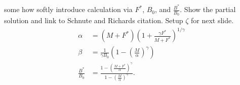 \documentclass[ xcolor = pdftex, dvipsnames, table ]{beamer}
\begin{document}
\begin{frame}
\begin{minipage}[h!]{0.52\textwidth}
\end{minipage}

\end{frame}

%
%

%
\begin{frame}

{\color{red}
some how softly introduce calculation via $F^*$, $B_0$, and $\frac{B^*}{B_0}$. Show the partial solution and link to Schnute and Richards citation. Setup $\zeta$ for next slide.
}
\begin{align}
\alpha &= (M+F^*)\left(1+\frac{\gamma F^*}{M+F^*}\right)^{1/\gamma} \nonumber\\
\beta &= \frac{1}{\gamma B_0}\left(1-\left(\frac{M}{\alpha}\right)^\gamma\right) \label{abgSys}\\
\frac{B^*}{B_0} &= \frac{1-\left(\frac{M+F^*}{\alpha}\right)^\gamma}{ 1-\left(\frac{M}{\alpha}\right)^\gamma } \nonumber.
\end{align}
\end{frame}
\end{document}
